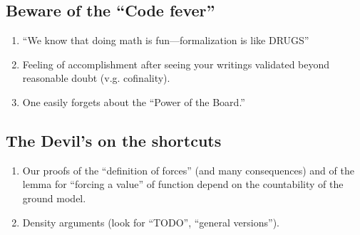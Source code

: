 \subsection{Beware of the “Code fever”}\label{sec:beware-code-fever}
\begin{enumerate}
\item “We know that doing math is fun---formalization is like DRUGS”
\item Feeling of accomplishment after seeing your writings
  validated beyond reasonable doubt (v.g. cofinality).

\item One easily forgets about the “Power of the Board.”
\end{enumerate}

\subsection{The Devil's on the shortcuts}
\begin{enumerate}
\item
  Our proofs of the “definition of forces” (and many
  consequences) and of the lemma for “forcing a value” of function
  depend on the countability of the ground model. 
\item
  Density arguments (look for “TODO”, “general versions”).
\end{enumerate}

